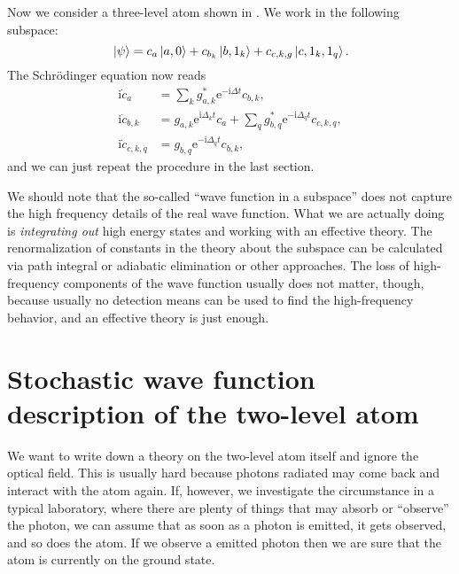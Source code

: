 \documentclass[hyperref, a4paper]{article}
\newcommand*{\ii}{\mathrm{i}}
\newcommand*{\ee}{\mathrm{e}}
\begin{document}
Now we consider a three-level atom shown in . We work in the following 
subspace:
\begin{equation}
    \ket*{\psi} = c_a \ket*{a, 0} + c_{b_k} \ket*{b, 1_k} + c_{c, k, g} \ket*{c, 1_k, 1_q}. 
\end{equation}
The Schrödinger equation now reads 
\begin{equation}
    \begin{aligned}
        \ii \dot{c}_a &= \sum_k g_{a, k}^* \ee^{- \ii \Delta t} c_{b, k}, \\
        \ii \dot{c}_{b, k} &= g_{a,k} \ee^{\ii \Delta_k t} c_a 
        + \sum_q g^*_{b,q} \ee^{- \ii \Delta_q t} c_{c, k, q}, \\
        \ii \dot{c}_{c, k, q} &= g_{b,q} \ee^{- \ii \Delta_q t} c_{b, k},
    \end{aligned}
\end{equation} 
and we can just repeat the procedure in the last section.

\begin{note*}{}{}
    We should note that the so-called ``wave function in a subspace'' does not capture the high frequency 
    details of the real wave function. What we are actually doing is \emph{integrating out} high energy 
    states and working with an effective theory. The renormalization of constants in the theory about 
    the subspace can be calculated via path integral or adiabatic elimination or other approaches.
    The loss of high-frequency components of the wave function usually does not matter, though, 
    because usually no detection means can be used to find the high-frequency behavior, and an effective
    theory is just enough.
\end{note*}

\section{Stochastic wave function description of the two-level atom}\label{sec:stochastic-two-level}

We want to write down a theory on the two-level atom itself and ignore the optical field. 
This is usually hard because photons radiated may come back and interact with the atom again.
If, however, we investigate the circumstance in a typical laboratory, where there are plenty 
of things that may absorb or ``observe'' the photon, we can assume that as soon as a photon 
is emitted, it gets observed, and so does the atom. If we observe a emitted photon then we are sure 
that the atom is currently on the ground state.
\end{document}
